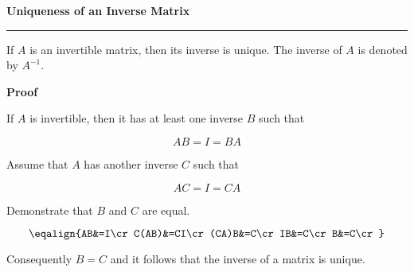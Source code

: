 \nopagenumbers
{\bf Uniqueness of an Inverse Matrix}
\vskip 1mm
\hrule

\vskip 6pt
If $A$ is an invertible matrix, then its inverse is unique. The inverse of $A$ is denoted by $A^{-1}$.

\vskip 10pt
{\bf Proof}

\vskip 6pt
If $A$ is invertible, then it has at least one inverse $B$ such that

$$AB=I=BA$$

Assume that $A$ has another inverse $C$ such that

$$AC=I=CA$$

Demonstrate that $B$ and $C$ are equal.

$$\eqalign{AB&=I\cr
	C(AB)&=CI\cr
	(CA)B&=C\cr
	IB&=C\cr
	B&=C\cr}$$

Consequently $B=C$ and it follows that the inverse of a matrix is unique.

\vfill\eject
\bye
